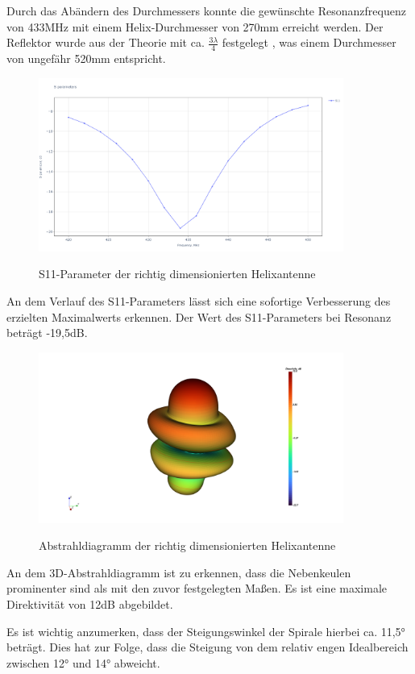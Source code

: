 Durch das Abändern des Durchmessers konnte die gewünschte Resonanzfrequenz von 433MHz mit einem Helix-Durchmesser von 270mm erreicht werden. Der Reflektor wurde aus der Theorie mit ca. $\frac{3\lambda}{4}$ festgelegt \cite{Kraus-2002-AntennasB}, was einem Durchmesser von ungefähr 520mm entspricht.

\begin{figure}[H]
	\centering
	\includegraphics[width=10cm]{../ref/helix-fertig-S11.png}
	\label{fig:fertigeHelix-S11}
	\caption{S11-Parameter der richtig dimensionierten Helixantenne}
\end{figure}

An dem Verlauf des S11-Parameters lässt sich eine sofortige Verbesserung des erzielten Maximalwerts erkennen. Der Wert des S11-Parameters bei Resonanz beträgt -19,5dB.

\begin{figure}[H]
	\centering
	\includegraphics[width=10cm]{../ref/helix-fertig-radiation-pattern.png}
	\label{fig:fertigeHelix-Radiation}
	\caption{Abstrahldiagramm der richtig dimensionierten Helixantenne}
\end{figure}

An dem 3D-Abstrahldiagramm ist zu erkennen, dass die Nebenkeulen prominenter sind als mit den zuvor festgelegten Maßen. Es ist eine maximale Direktivität von 12dB abgebildet.

Es ist wichtig anzumerken, dass der Steigungswinkel der Spirale hierbei ca. 11,5° beträgt. Dies hat zur Folge, dass die Steigung von dem relativ engen Idealbereich zwischen 12° und 14° abweicht.

